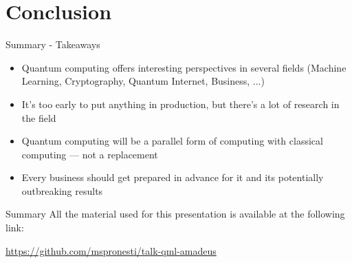 \graphicspath{{assets/conclusions/}}


\section{Conclusion}
    \begin{frame}{Summary - Takeaways}
        \begin{itemize}
            \item Quantum computing offers interesting perspectives in several fields (Machine Learning, Cryptography, Quantum Internet, Business, ...)
            \item It's too early to put anything in \alert{production}, but there's a lot of \alert{research} in the field
            \item Quantum computing will be a \alert{parallel} form of computing with classical computing — not a \alert{replacement}
            \item Every business should get prepared in advance for it and its potentially \alert{outbreaking} results
        \end{itemize}        
    \end{frame}

	\begin{frame}{Summary}
    	All the material used for this presentation is available at the following link:
		
    	\begin{center}
    		\url{https://github.com/mspronesti/talk-qml-amadeus}
    	\end{center}
    	\begin{center}\ccbysa\end{center}
    \end{frame}

